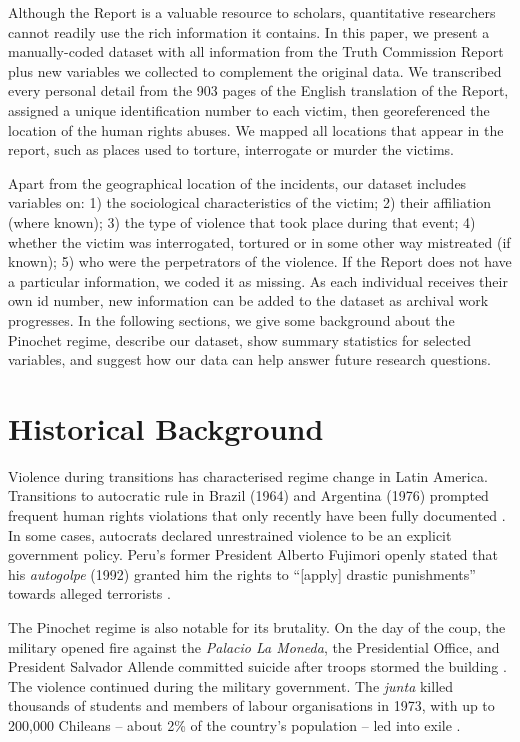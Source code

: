 \documentclass[12pt,a4paper,]{article}
\begin{document}
Although the Report is a valuable resource to scholars, quantitative
researchers cannot readily use the rich information it contains. In this
paper, we present a manually-coded dataset with all information from the
Truth Commission Report plus new variables we collected to complement
the original data. We transcribed every personal detail from the 903
pages of the English translation of the Report, assigned a unique
identification number to each victim, then georeferenced the location of
the human rights abuses. We mapped all locations that appear in the
report, such as places used to torture, interrogate or murder the
victims.

Apart from the geographical location of the incidents, our dataset
includes variables on: 1) the sociological characteristics of the
victim; 2) their affiliation (where known); 3) the type of violence that
took place during that event; 4) whether the victim was interrogated,
tortured or in some other way mistreated (if known); 5) who were the
perpetrators of the violence. If the Report does not have a particular
information, we coded it as missing. As each individual receives their
own id number, new information can be added to the dataset as archival
work progresses. In the following sections, we give some background
about the Pinochet regime, describe our dataset, show summary statistics
for selected variables, and suggest how our data can help answer future
research questions.

\newpage

\hypertarget{historical-background}{%
\section{Historical Background}\label{historical-background}}

Violence during transitions has characterised regime change in Latin
America. Transitions to autocratic rule in Brazil (1964) and Argentina
(1976) prompted frequent human rights violations that only recently have
been fully documented \citep{agosin1987generals, elpais2016argentina}.
In some cases, autocrats declared unrestrained violence to be an
explicit government policy. Peru's former President Alberto Fujimori
openly stated that his \emph{autogolpe} (1992) granted him the rights to
``{[}apply{]} drastic punishments'' towards alleged terrorists
\citetext{\citealp[97]{dabene1997narcodemocracias}; \citealp[56]{samtleben2013constitucion}}.

The Pinochet regime is also notable for its brutality. On the day of the
coup, the military opened fire against the \emph{Palacio La Moneda}, the
Presidential Office, and President Salvador Allende committed suicide
after troops stormed the building \citep{verdugo2001chile}. The violence
continued during the military government. The \emph{junta} killed
thousands of students and members of labour organisations in 1973, with
up to 200,000 Chileans -- about 2\% of the country's population -- led
into exile \citep[31]{wright2007chilean}.
\end{document}
